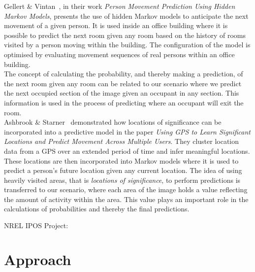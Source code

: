Gellert \& Vintan~\cite{gellert}, in their work \emph{Person Movement Prediction Using Hidden Markov Models}, presents the use of hidden Markov models to anticipate the next movement of a given person. It is used inside an office building where it is possible to predict the next room given any room based on the history of rooms visited by a person moving within the building. The configuration of the model is optimised by evaluating movement sequences of real persons within an office building. \\
The concept of calculating the probability, and thereby making a prediction, of the next room given any room can be related to our scenario where we predict the next occupied section of the image given an occupant in any section. This information is used in the process of predicting where an occupant will exit the room. \\
Ashbrook \& Starner~\cite{ashbrook} demonstrated how locations of significance can be incorporated into a predictive model in the paper \emph{Using GPS to Learn Significant Locations and Predict Movement Across Multiple Users}. They cluster location data from a GPS over an extended period of time and infer meaningful locations. These locations are then incorporated into Markov models where it is used to predict a person's future location given any current location. The idea of using heavily visited areas, that is \emph{locations of significance}, to perform predictions is transferred to our scenario, where each area of the image holds a value reflecting the amount of activity within the area. This value plays an important role in the calculations of probabilities and thereby the final predictions.

NREL IPOS Project:





\section{Approach}

